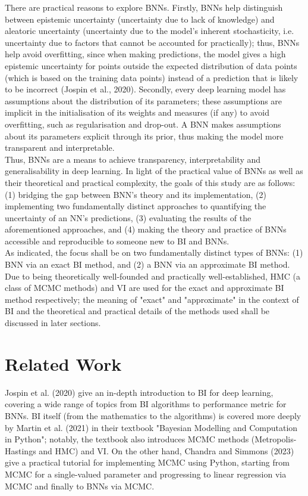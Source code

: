 \documentclass[conference]{IEEEtran}
\begin{document}
There are practical reasons to explore BNNs. Firstly, BNNs help distinguish between epistemic uncertainty (uncertainty due to lack of knowledge) and aleatoric uncertainty (uncertainty due to the model's inherent stochasticity, i.e. uncertainty due to factors that cannot be accounted for practically); thus, BNNs help avoid overfitting, since when making predictions, the model gives a high epistemic uncertainty for points outside the expected distribution of data points (which is based on the training data points) instead of a prediction that is likely to be incorrect (Jospin et al., 2020). Secondly, every deep learning model has assumptions about the distribution of its parameters; these assumptions are implicit in the initialisation of its weights and measures (if any) to avoid overfitting, such as regularisation and drop-out. A BNN makes assumptions about its parameters explicit through its prior, thus making the model more transparent and interpretable.\\

Thus, BNNs are a means to achieve transparency, interpretability and generalisability in deep learning. In light of the practical value of BNNs as well as their theoretical and practical complexity, the goals of this study are as follows: (1) bridging the gap between BNN’s theory and its implementation, (2) implementing two fundamentally distinct approaches to quantifying the uncertainty of an NN's predictions, (3) evaluating the results of the aforementioned approaches, and (4) making the theory and practice of BNNs accessible and reproducible to someone new to BI and BNNs.\\

As indicated, the focus shall be on two fundamentally distinct types of BNNs: (1) BNN via an exact BI method, and (2) a BNN via an approximate BI method. Due to being theoretically well-founded and practically well-established, HMC (a class of MCMC methods) and VI are used for the exact and approximate BI method respectively; the meaning of "exact" and "approximate" in the context of BI and the theoretical and practical details of the methods used shall be discussed in later sections.\\

\section{Related Work}
Jospin et al. (2020) give an in-depth introduction to BI for deep learning, covering a wide range of topics from BI algorithms to performance metric for BNNs. BI itself (from the mathematics to the algorithms) is covered more deeply by Martin et al. (2021) in their textbook "Bayesian Modelling and Computation in Python"; notably, the textbook also introduces MCMC methods (Metropolis-Hastings and HMC) and VI. On the other hand, Chandra and Simmons (2023) give a practical tutorial for implementing MCMC using Python, starting from MCMC for a single-valued parameter and progressing to linear regression via MCMC and finally to BNNs via MCMC.\\
\end{document}
